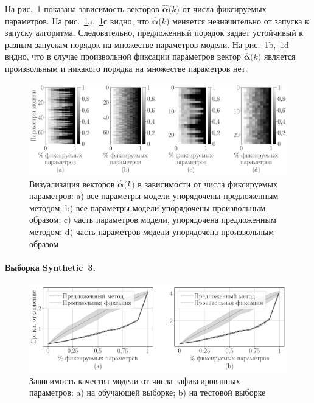 На рис.~\ref{fg:ex:bost:2} показана зависимость векторов $\hat{\bm{\alpha}}\bigr(k\bigr)$ от числа фиксируемых параметров. На рис.~\ref{fg:ex:bost:2}a,~\ref{fg:ex:bost:2}с видно, что $\hat{\bm{\alpha}}\bigr(k\bigr)$ меняется незначительно от запуска к запуску алгоритма. Следовательно, предложенный порядок задает устойчивый к разным запускам порядок на множестве параметров модели. На рис.~\ref{fg:ex:bost:2}b,~\ref{fg:ex:bost:2}d видно, что в случае произвольной фиксации параметров вектор $\hat{\bm{\alpha}}\bigr(k\bigr)$ является произвольным и никакого порядка на множестве параметров нет.

\begin{figure}[h!t]\center
\includegraphics[width=1\textwidth]{results/order/boston_data_matshow}
\caption{Визуализация векторов $\hat{\bm{\alpha}}\bigr(k\bigr)$ в зависимости от числа фиксируемых параметров: a) все параметры модели упорядочены предложенным методом; b) все параметры модели упорядочены произвольным образом; c) часть параметров модели, упорядочена предложенным методом; d) часть параметров модели упорядочена произвольным образом}
\label{fg:ex:bost:2}
\end{figure}

\paragraph{Выборка Synthetic~3.}
\begin{figure}[h!t]\center
\includegraphics[width=1\textwidth]{results/order/generate_data_linear_loss}
\caption{Зависимость качества модели от числа зафиксированных параметров: a) на обучающей выборке; b) на тестовой выборке}
\label{fg:ex:syn1:1}
\end{figure}

